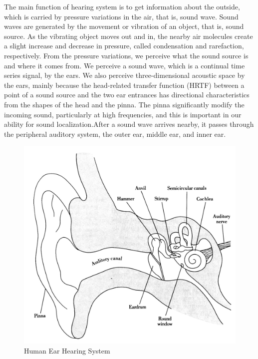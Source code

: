 The main function of hearing system is to get information about the outside, which is
carried by pressure variations in the air, that is, sound wave. Sound waves are
generated by the movement or vibration of an object, that is, sound source. As the
vibrating object moves out and in, the nearby air molecules create a slight increase
and decrease in pressure, called condensation and rarefaction, respectively. From the
pressure variations, we perceive what the sound source is and where it comes from.
We perceive a sound wave, which is a continual time series signal, by the ears.
We also perceive three-dimensional acoustic space by the ears, mainly because the
head-related transfer function (HRTF) between a point of a sound source and
the two ear entrances has directional characteristics from the shapes of the head and
the pinna. The pinna significantly modify the incoming sound, particularly at
high frequencies, and this is important in our ability for sound localization.After 
a sound wave arrives nearby, it passes through the peripheral auditory system, 
the outer ear, middle ear, and inner ear.
\begin{figure}
	\begin{center}
		\includegraphics[scale=0.8]{images/ear_clear.jpg}
		\caption{Human Ear Hearing System}
	\end{center}
\end{figure}

